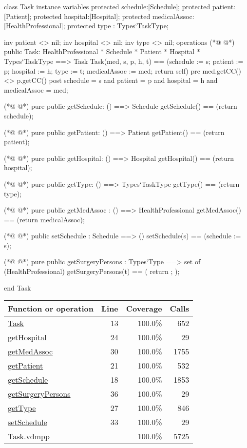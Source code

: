 \begin{vdmpp}[breaklines=true]
class Task
instance variables
  protected schedule:[Schedule];
  protected patient:[Patient];
  protected hospital:[Hospital];
  protected medicalAssoc:[HealthProfessional];
  protected type : Types`TaskType;
  
  inv patient <> nil;
  inv hospital <> nil;
  inv type <> nil;
operations
(*@
\label{Task:13}
@*)
 public Task: HealthProfessional * Schedule * Patient * Hospital * Types`TaskType ==> Task
  Task(med, s, p, h, t) == (schedule := s; patient := p; hospital := h; type := t; medicalAssoc := med; return self)
 pre med.getCC() <> p.getCC()
 post schedule = s and patient = p and hospital = h and medicalAssoc = med;
 
(*@
\label{getSchedule:18}
@*)
 pure public getSchedule: () ==> Schedule
  getSchedule() == (return schedule);
  
(*@
\label{getPatient:21}
@*)
 pure public getPatient: () ==> Patient
  getPatient() == (return patient);
  
(*@
\label{getHospital:24}
@*)
 pure public getHospital: () ==> Hospital
  getHospital() == (return hospital);
  
(*@
\label{getType:27}
@*)
 pure public getType: () ==> Types`TaskType
  getType() == (return type);
  
(*@
\label{getMedAssoc:30}
@*)
 pure public getMedAssoc : () ==> HealthProfessional
  getMedAssoc() == (return medicalAssoc);
  
(*@
\label{setSchedule:33}
@*)
 public setSchedule : Schedule ==> ()
  setSchedule(s) == (schedule := s);
  
(*@
\label{getSurgeryPersons:36}
@*)
 pure public getSurgeryPersons : Types`Type ==> set of (HealthProfessional)
  getSurgeryPersons(t) == ( return {}; );

end Task
\end{vdmpp}
\bigskip
\begin{longtable}{|l|r|r|r|}
\hline
Function or operation & Line & Coverage & Calls \\
\hline
\hline
\hyperref[Task:13]{Task} & 13&100.0\% & 652 \\
\hline
\hyperref[getHospital:24]{getHospital} & 24&100.0\% & 29 \\
\hline
\hyperref[getMedAssoc:30]{getMedAssoc} & 30&100.0\% & 1755 \\
\hline
\hyperref[getPatient:21]{getPatient} & 21&100.0\% & 532 \\
\hline
\hyperref[getSchedule:18]{getSchedule} & 18&100.0\% & 1853 \\
\hline
\hyperref[getSurgeryPersons:36]{getSurgeryPersons} & 36&100.0\% & 29 \\
\hline
\hyperref[getType:27]{getType} & 27&100.0\% & 846 \\
\hline
\hyperref[setSchedule:33]{setSchedule} & 33&100.0\% & 29 \\
\hline
\hline
Task.vdmpp & & 100.0\% & 5725 \\
\hline
\end{longtable}

